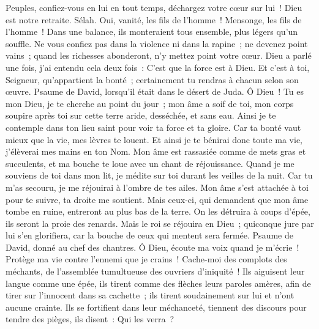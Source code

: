 \begin{multicols}{2}
Peuples, confiez-vous en lui en tout temps, déchargez votre cœur sur lui~! Dieu est notre retraite. Sélah.
Oui, vanité, les fils de l'homme~! Mensonge, les fils de l'homme~! Dans une balance, ils monteraient tous ensemble, plus légers qu'un souffle.
Ne vous confiez pas dans la violence ni dans la rapine~; ne devenez point vains~; quand les richesses abonderont, n'y mettez point votre cœur.
Dieu a parlé une fois, j'ai entendu cela deux fois~: C'est que la force est à Dieu.
Et c'est à toi, Seigneur, qu'appartient la bonté~; certainement tu rendras à chacun selon son œuvre.
\VerseOne{}Psaume de David, lorsqu'il était dans le désert de Juda.
Ô Dieu~! Tu es mon Dieu, je te cherche au point du jour~; mon âme a soif de toi, mon corps soupire après toi sur cette terre aride, desséchée, et sans eau.
Ainsi je te contemple dans ton lieu saint pour voir ta force et ta gloire.
Car ta bonté vaut mieux que la vie, mes lèvres te louent.
Et ainsi je te bénirai donc toute ma vie, j'élèverai mes mains en ton Nom.
Mon âme est rassasiée comme de mets gras et succulents, et ma bouche te loue avec un chant de réjouissance.
Quand je me souviens de toi dans mon lit, je médite sur toi durant les veilles de la nuit.
Car tu m'as secouru, je me réjouirai à l'ombre de tes ailes.
Mon âme s'est attachée à toi pour te suivre, ta droite me soutient.
Mais ceux-ci, qui demandent que mon âme tombe en ruine, entreront au plus bas de la terre.
On les détruira à coups d'épée, ils seront la proie des renards.
Mais le roi se réjouira en Dieu~; quiconque jure par lui s'en glorifiera, car la bouche de ceux qui mentent sera fermée.
\VerseOne{}Psaume de David, donné au chef des chantres.
Ô Dieu, écoute ma voix quand je m'écrie~! Protège ma vie contre l'ennemi que je crains~!
Cache-moi des complots des méchants, de l'assemblée tumultueuse des ouvriers d'iniquité~!
Ils aiguisent leur langue comme une épée, ils tirent comme des flèches leurs paroles amères,
afin de tirer sur l'innocent dans sa cachette~; ils tirent soudainement sur lui et n'ont aucune crainte.
Ils se fortifient dans leur méchanceté, tiennent des discours pour tendre des pièges, ils disent~: Qui les verra~?

\end{multicols}
